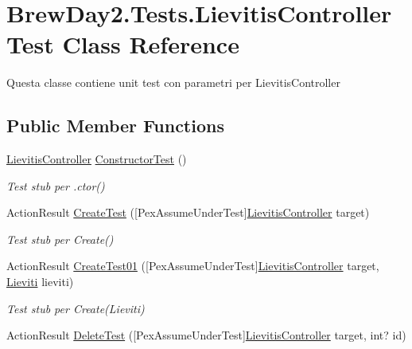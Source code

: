 \hypertarget{class_brew_day2_1_1_tests_1_1_lievitis_controller_test}{}\section{Brew\+Day2.\+Tests.\+Lievitis\+Controller\+Test Class Reference}
\label{class_brew_day2_1_1_tests_1_1_lievitis_controller_test}


Questa classe contiene unit test con parametri per Lievitis\+Controller 


\subsection*{Public Member Functions}
\begin{DoxyCompactItemize}
\item 
\mbox{\hyperlink{class_brew_day2_1_1_controllers_1_1_lievitis_controller}{Lievitis\+Controller}} \mbox{\hyperlink{class_brew_day2_1_1_tests_1_1_lievitis_controller_test_a2f573de26fd7ca2268b9f919d252090d}{Constructor\+Test}} ()
\begin{DoxyCompactList}\small\item\em Test stub per .ctor()\end{DoxyCompactList}\item 
Action\+Result \mbox{\hyperlink{class_brew_day2_1_1_tests_1_1_lievitis_controller_test_a5c9a1a2c52327c3e54759e085441c3fb}{Create\+Test}} (\mbox{[}Pex\+Assume\+Under\+Test\mbox{]}\mbox{\hyperlink{class_brew_day2_1_1_controllers_1_1_lievitis_controller}{Lievitis\+Controller}} target)
\begin{DoxyCompactList}\small\item\em Test stub per Create()\end{DoxyCompactList}\item 
Action\+Result \mbox{\hyperlink{class_brew_day2_1_1_tests_1_1_lievitis_controller_test_a798d479f3f7bbb8305c4e00d00da19ca}{Create\+Test01}} (\mbox{[}Pex\+Assume\+Under\+Test\mbox{]}\mbox{\hyperlink{class_brew_day2_1_1_controllers_1_1_lievitis_controller}{Lievitis\+Controller}} target, \mbox{\hyperlink{class_brew_day2_1_1_models_1_1_lieviti}{Lieviti}} lieviti)
\begin{DoxyCompactList}\small\item\em Test stub per Create(\+Lieviti)\end{DoxyCompactList}\item 
Action\+Result \mbox{\hyperlink{class_brew_day2_1_1_tests_1_1_lievitis_controller_test_ae84fccd200fb39e9e8ebc5a00d72f0fb}{Delete\+Test}} (\mbox{[}Pex\+Assume\+Under\+Test\mbox{]}\mbox{\hyperlink{class_brew_day2_1_1_controllers_1_1_lievitis_controller}{Lievitis\+Controller}} target, int? id)

\end{DoxyCompactItemize}
